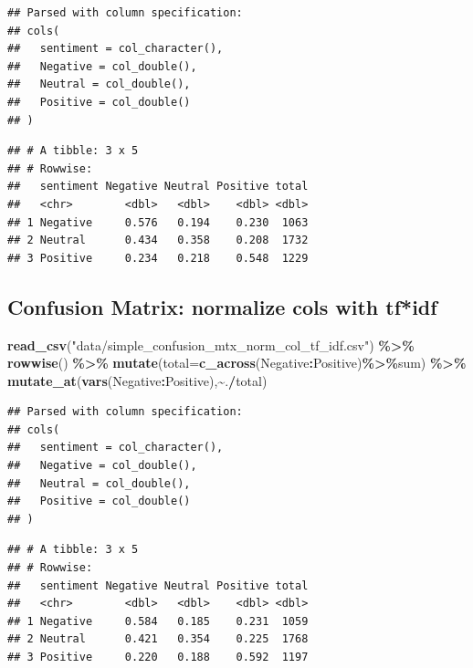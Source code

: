 \documentclass[
]{article}
\newenvironment{Shaded}{\begin{snugshade}}{\end{snugshade}}
\newcommand{\DataTypeTok}[1]{\textcolor[rgb]{0.13,0.29,0.53}{#1}}
\newcommand{\KeywordTok}[1]{\textcolor[rgb]{0.13,0.29,0.53}{\textbf{#1}}}
\newcommand{\NormalTok}[1]{#1}
\newcommand{\OperatorTok}[1]{\textcolor[rgb]{0.81,0.36,0.00}{\textbf{#1}}}
\newcommand{\StringTok}[1]{\textcolor[rgb]{0.31,0.60,0.02}{#1}}
\begin{document}
\begin{verbatim}
## Parsed with column specification:
## cols(
##   sentiment = col_character(),
##   Negative = col_double(),
##   Neutral = col_double(),
##   Positive = col_double()
## )
\end{verbatim}

\begin{verbatim}
## # A tibble: 3 x 5
## # Rowwise: 
##   sentiment Negative Neutral Positive total
##   <chr>        <dbl>   <dbl>    <dbl> <dbl>
## 1 Negative     0.576   0.194    0.230  1063
## 2 Neutral      0.434   0.358    0.208  1732
## 3 Positive     0.234   0.218    0.548  1229
\end{verbatim}

\hypertarget{confusion-matrix-normalize-cols-with-tfidf}{%
\subsection{Confusion Matrix: normalize cols with
tf*idf}\label{confusion-matrix-normalize-cols-with-tfidf}}

\begin{Shaded}
\begin{Highlighting}[]
\KeywordTok{read\_csv}\NormalTok{(}\StringTok{"data/simple\_confusion\_mtx\_norm\_col\_tf\_idf.csv"}\NormalTok{) }\OperatorTok{\%\textgreater{}\%}
\StringTok{  }\KeywordTok{rowwise}\NormalTok{() }\OperatorTok{\%\textgreater{}\%}
\StringTok{  }\KeywordTok{mutate}\NormalTok{(}\DataTypeTok{total=}\KeywordTok{c\_across}\NormalTok{(Negative}\OperatorTok{:}\NormalTok{Positive)}\OperatorTok{\%\textgreater{}\%}\NormalTok{sum) }\OperatorTok{\%\textgreater{}\%}
\StringTok{  }\KeywordTok{mutate\_at}\NormalTok{(}\KeywordTok{vars}\NormalTok{(Negative}\OperatorTok{:}\NormalTok{Positive),}\OperatorTok{\textasciitilde{}}\NormalTok{.}\OperatorTok{/}\NormalTok{total)}
\end{Highlighting}
\end{Shaded}

\begin{verbatim}
## Parsed with column specification:
## cols(
##   sentiment = col_character(),
##   Negative = col_double(),
##   Neutral = col_double(),
##   Positive = col_double()
## )
\end{verbatim}

\begin{verbatim}
## # A tibble: 3 x 5
## # Rowwise: 
##   sentiment Negative Neutral Positive total
##   <chr>        <dbl>   <dbl>    <dbl> <dbl>
## 1 Negative     0.584   0.185    0.231  1059
## 2 Neutral      0.421   0.354    0.225  1768
## 3 Positive     0.220   0.188    0.592  1197
\end{verbatim}
\end{document}
